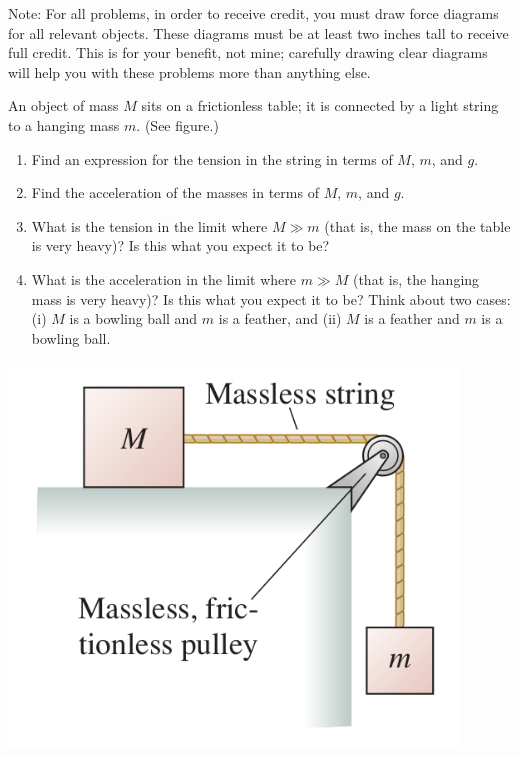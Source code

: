 \documentclass[12pt]{article}
\begin{document}
\Large
\centerline{}
\normalsize
\centerline{}

{\sc Note:} For all problems, in order to receive credit, you must draw force diagrams for all relevant objects. These diagrams must be at least two inches tall to receive full credit.
This is for your benefit, not mine; carefully drawing clear diagrams will help you with these problems more than anything else.

\begin{enumerate}


  \begin{minipage}{0.7\textwidth}
\item  An object of mass $M$ sits on a frictionless table; it is connected by
   a light string to a hanging mass $m$. (See figure.)
\begin{enumerate}
\item Find an expression for the tension in the string in terms of $M$, $m$, and $g$.
\item Find the acceleration of the masses in terms of $M$, $m$, and $g$.
\item What is the tension in the limit where $M \gg m$ (that is, the mass on the table is very heavy)? Is this what you expect it to be?
\item What is the acceleration in the limit where $m \gg M$ (that is, the hanging mass is very heavy)? Is this what you expect it to be? Think about two cases: (i) $M$ is a bowling ball and $m$ is a feather, and (ii) $M$ is a feather and $m$ is a bowling ball.
\end{enumerate}
  \end{minipage}
  \begin{minipage}{0.3\textwidth}
\centerline{\includegraphics[width=0.9\textwidth]{problem736.png}}
  \end{minipage}


\end{enumerate}
\end{document}
